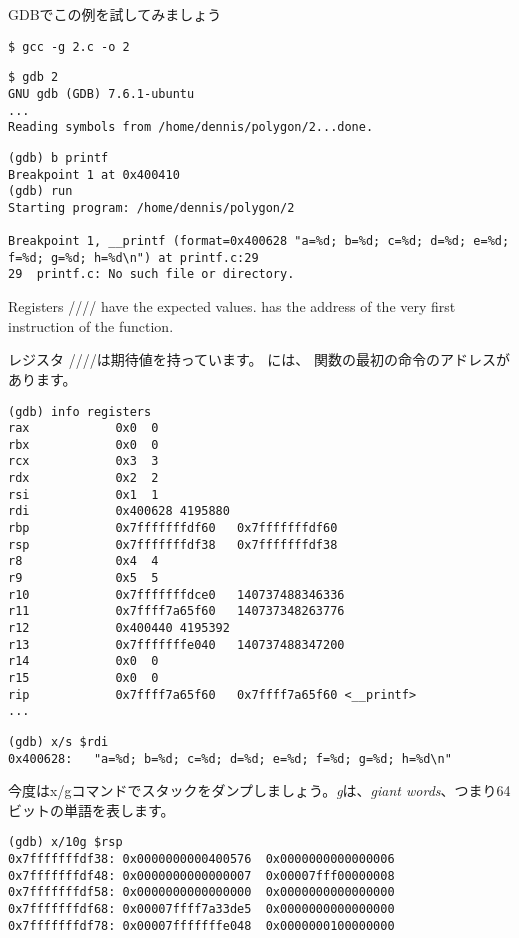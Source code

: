 \ac{GDB}でこの例を試してみましょう

\begin{lstlisting}
$ gcc -g 2.c -o 2
\end{lstlisting}

\begin{lstlisting}
$ gdb 2
GNU gdb (GDB) 7.6.1-ubuntu
...
Reading symbols from /home/dennis/polygon/2...done.
\end{lstlisting}

\begin{lstlisting}[caption=ブレークポイントを \printf{} に設定して実行しましょう]
(gdb) b printf
Breakpoint 1 at 0x400410
(gdb) run
Starting program: /home/dennis/polygon/2 

Breakpoint 1, __printf (format=0x400628 "a=%d; b=%d; c=%d; d=%d; e=%d; f=%d; g=%d; h=%d\n") at printf.c:29
29	printf.c: No such file or directory.
\end{lstlisting}

Registers \RSI/\RDX/\RCX// have the expected values.
\RIP has the address of the very first instruction of the \printf function.

レジスタ \RSI/\RDX/\RCX//は期待値を持っています。
\RIP には、 \printf 関数の最初の命令のアドレスがあります。

\begin{lstlisting}
(gdb) info registers
rax            0x0	0
rbx            0x0	0
rcx            0x3	3
rdx            0x2	2
rsi            0x1	1
rdi            0x400628	4195880
rbp            0x7fffffffdf60	0x7fffffffdf60
rsp            0x7fffffffdf38	0x7fffffffdf38
r8             0x4	4
r9             0x5	5
r10            0x7fffffffdce0	140737488346336
r11            0x7ffff7a65f60	140737348263776
r12            0x400440	4195392
r13            0x7fffffffe040	140737488347200
r14            0x0	0
r15            0x0	0
rip            0x7ffff7a65f60	0x7ffff7a65f60 <__printf>
...
\end{lstlisting}

\begin{lstlisting}[caption=let's inspect the format string]
(gdb) x/s $rdi
0x400628:	"a=%d; b=%d; c=%d; d=%d; e=%d; f=%d; g=%d; h=%d\n"
\end{lstlisting}

今度はx/gコマンドでスタックをダンプしましょう。\emph{g}は、\emph{giant words}、つまり64ビットの単語を表します。

\begin{lstlisting}
(gdb) x/10g $rsp
0x7fffffffdf38:	0x0000000000400576	0x0000000000000006
0x7fffffffdf48:	0x0000000000000007	0x00007fff00000008
0x7fffffffdf58:	0x0000000000000000	0x0000000000000000
0x7fffffffdf68:	0x00007ffff7a33de5	0x0000000000000000
0x7fffffffdf78:	0x00007fffffffe048	0x0000000100000000
\end{lstlisting}


